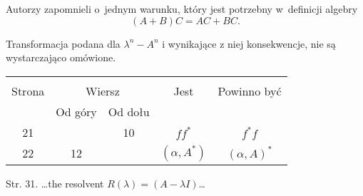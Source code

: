 \documentclass[a4paper,11pt]{article}
\begin{document}


\start {} Autorzy zapomnieli o~jednym warunku, który jest
potrzebny w~definicji algebry
\begin{equation}
  \label{eq:BRVolI-s01-01}
  ( A + B ) C = A C + B C.
\end{equation}

\vspace{\spaceFour}



\start {} Transformacja podana dla $\lambda^{ n } - A^{ n }$ i
wynikające z niej konsekwencje, nie są wystarczająco omówione.

\vspace{\spaceFour}







\begin{center}
  \begin{tabular}{|c|c|c|c|c|}
    \hline
    & \multicolumn{2}{c|}{} & & \\
    Strona & \multicolumn{2}{c|}{Wiersz} & Jest
                              & Powinno być \\ \cline{2-3}
    & Od góry & Od dołu & & \\
    \hline
    21  & & 10 & $ff^{ * }$ & $f^{ * }\! f$ \\
    22  & 12 & & $( \alpha, A^{ * } )$ & $( \alpha, A )^{ * }$ \\
    \hline
  \end{tabular}

\end{center}


Str. 31. \ldots the resolvent $R( \lambda ) = ( A - \lambda I )$\ldots
\end{document}
